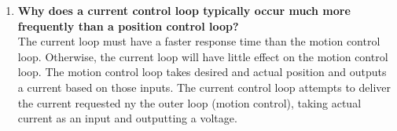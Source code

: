 \documentclass{article}
\begin{document}
\begin{enumerate}[label=\textbf{\arabic*})]
    \item \textbf{Why does a current control loop typically occur much more frequently than a position control 
    loop? } \\

    The current loop must have a faster response time than the motion control loop. Otherwise, the current loop will 
    have little effect on the motion control loop. The motion control loop takes desired and actual position and outputs
    a current based on those inputs. The current control loop attempts to deliver the current requested ny the outer
    loop (motion control), taking actual current as an input and outputting a voltage.


\end{enumerate}
\end{document}
